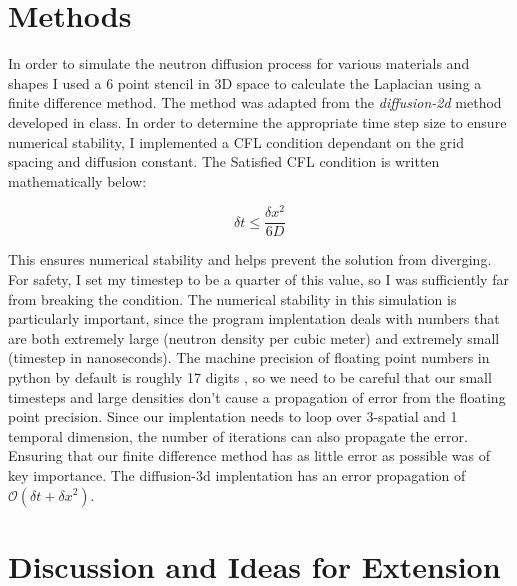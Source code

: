 \documentclass[letterpaper, 12pt]{article}
\begin{document}
    \section{  Methods}
      In order to simulate the neutron diffusion process for various materials and shapes I used a 6 point stencil in 3D space to calculate the Laplacian using a finite difference method. The method was adapted from the \textit{diffusion-2d} method developed in class. In order to determine the appropriate time step size to ensure numerical stability, I implemented a CFL condition dependant on the grid spacing and diffusion constant. The Satisfied CFL condition is written mathematically below:
      
      \begin{equation}
         \delta t \le \frac{\delta x^2}{6D}
      \end{equation}

      This ensures numerical stability and helps prevent the solution from diverging. For safety, I set my timestep to be a quarter of this value, so I was sufficiently far from breaking the condition. The numerical stability in this simulation is particularly important, since the program implentation deals with numbers that are both extremely large (neutron density per cubic meter) and extremely small (timestep in nanoseconds). The machine precision of floating point numbers in python by default is
      roughly 17 digits \cite{Python-Floating-Point-Error}, so we need to be careful that our small timesteps and large densities don't cause a propagation of error from the floating point precision. Since our implentation needs to loop over 3-spatial and 1 temporal dimension, the number of iterations can also propagate the error. Ensuring that our finite difference method has as little error as possible was of key importance. The diffusion-3d implentation has an error propagation of $\mathcal{O} (\delta t + \delta x^2)$.\\

   \section{   Discussion and Ideas for Extension}
\end{document}
